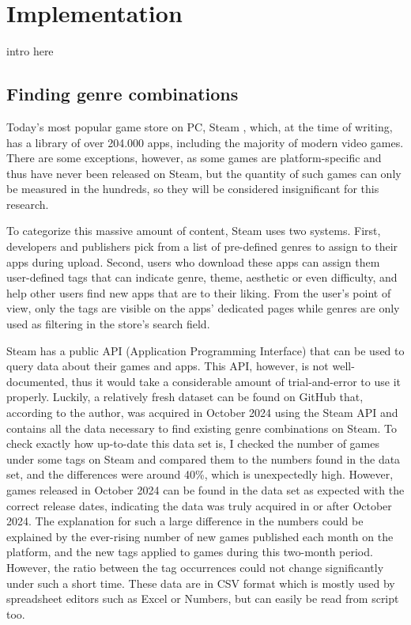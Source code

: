 \chapter{Implementation} \label{Chapter:Implementation}
intro here

\section{Finding genre combinations}

Today's most popular game store on PC, Steam \cite{steam}, which, at the time of writing, has a library of over 204.000 apps, including the majority of modern video games. There are some exceptions, however, as some games are platform-specific and thus have never been released on Steam, but the quantity of such games can only be measured in the hundreds, so they will be considered insignificant for this research.

To categorize this massive amount of content, Steam uses two systems. First, developers and publishers pick from a list of pre-defined genres to assign to their apps during upload. Second, users who download these apps can assign them user-defined tags that can indicate genre, theme, aesthetic or even difficulty, and help other users find new apps that are to their liking. From the user's point of view, only the tags are visible on the apps' dedicated pages while genres are only used as filtering in the store's search field.

Steam has a public API (Application Programming Interface) that can be used to query data about their games and apps. This API, however, is not well-documented, thus it would take a considerable amount of trial-and-error to use it properly. Luckily, a relatively fresh dataset \cite{steamCatalogInsight2024} can be found on GitHub that, according to the author, was acquired in October 2024 using the Steam API and contains all the data necessary to find existing genre combinations on Steam. To check exactly how up-to-date this data set is, I checked the number of games under some tags on Steam and compared them to the numbers found in the data set, and the differences were around 40\%, which is unexpectedly high. However, games released in October 2024 can be found in the data set as expected with the correct release dates, indicating the data was truly acquired in or after October 2024. The explanation for such a large difference in the numbers could be explained by the ever-rising number of new games published each month on the platform, and the new tags applied to games during this two-month period. However, the ratio between the tag occurrences could not change significantly under such a short time. These data are in CSV format which is mostly used by spreadsheet editors such as Excel or Numbers, but can easily be read from script too.

